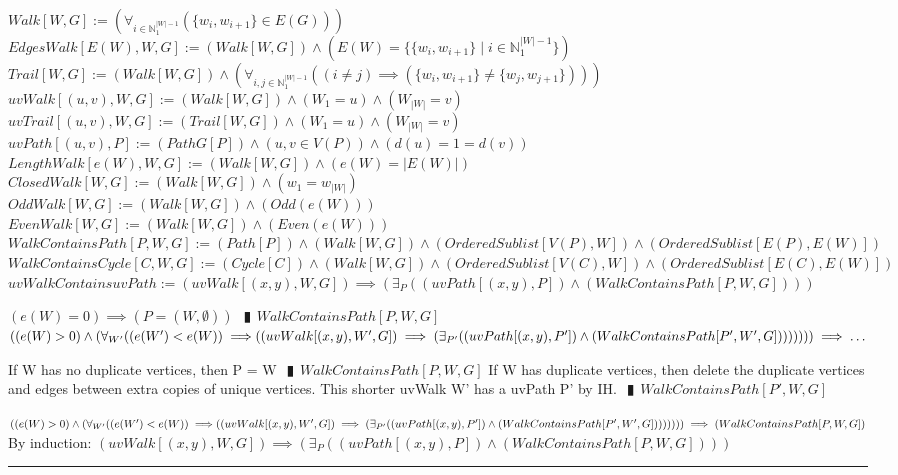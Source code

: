 \documentclass{book}
\newcommand{\abr}{:=}
\newcommand{\pipe}{$\phantom{(}\vrectangleblack\phantom{)}$}
\newcommand{\st}{\mathbin{|}}
\newcommand{\utup}[1]{\{#1\}}
\begin{document}
$Walk[W, G] \abr (\forall_{i \in \mathbb{N}_1^{|W| - 1}}(\utup{w_i, w_{i + 1}} \in E(G)))$ \\
$EdgesWalk[E(W), W, G] \abr (Walk[W, G]) \land (E(W) = \{\utup{w_i, w_{i + 1}} \st i \in \mathbb{N}_1^{|W| - 1} \})$ \\
$Trail[W, G] \abr (Walk[W, G]) \land (\forall_{i, j \in \mathbb{N}_1^{|W| - 1}}((i \neq j) \implies (\utup{w_i, w_{i + 1}} \neq \utup{w_j, w_{j + 1}})))$ \\
$uvWalk[(u, v), W, G] \abr (Walk[W, G]) \land (W_1 = u) \land (W_{|W|} = v)$ \\
$uvTrail[(u, v), W, G] \abr (Trail[W, G]) \land (W_1 = u) \land (W_{|W|} = v)$ \\
$uvPath[(u, v), P] \abr (PathG[P]) \land (u, v \in V(P)) \land (d(u) = 1 = d(v))$ \\
$LengthWalk[e(W), W, G] \abr (Walk[W, G]) \land (e(W) = |E(W)|)$ \\
$ClosedWalk[W, G] \abr (Walk[W, G]) \land (w_1 = w_{|W|})$ \\
$OddWalk[W, G] \abr (Walk[W, G]) \land (Odd(e(W)))$ \\
$EvenWalk[W, G] \abr (Walk[W, G]) \land (Even(e(W)))$ \\
$WalkContainsPath[P, W, G] \abr (Path[P]) \land (Walk[W, G]) \land (OrderedSublist[V(P), W]) \land (OrderedSublist[E(P), E(W)])$ \\
$WalkContainsCycle[C, W, G] \abr (Cycle[C]) \land (Walk[W, G]) \land (OrderedSublist[V(C), W]) \land (OrderedSublist[E(C), E(W)])$ \\

$uvWalkContainsuvPath \abr (uvWalk[(x, y), W, G]) \implies (\exists_{P}((uvPath[(x, y), P]) \land (WalkContainsPath[P, W, G])))$
\begin{enumerate}
  \lit $(e(W) = 0) \implies (P = (W, \emptyset))$ \pipe $WalkContainsPath[P, W, G]$
  \lit $((e(W) > 0) \land (\forall_{W'}((e(W') < e(W)) \implies \\
        ((uvWalk[(x, y), W', G]) \implies (\exists_{P'}((uvPath[(x, y), P']) \land (WalkContainsPath[P', W', G]))))))) \implies \ldots$
  \begin{enumerate}
    \lit If W has no duplicate vertices, then P = W \pipe $WalkContainsPath[P, W, G]$
    \lit If W has duplicate vertices, then delete the duplicate vertices and edges between extra copies of unique vertices. This shorter uvWalk W' has a uvPath P' by IH. \pipe $WalkContainsPath[P', W, G]$
  \end{enumerate}
  \lit $((e(W) > 0) \land (\forall_{W'}((e(W') < e(W)) \implies \\
  ((uvWalk[(x, y), W', G]) \implies (\exists_{P'}((uvPath[(x, y), P']) \land (WalkContainsPath[P', W', G]))))))) \implies (WalkContainsPath[P, W, G])$
  \lit By induction: $(uvWalk[(x, y), W, G]) \implies (\exists_{P}((uvPath[(x, y), P]) \land (WalkContainsPath[P, W, G])))$
\end{enumerate} \vspace{.75mm} \hrule \vspace{.75mm} \ \\
\end{document}

